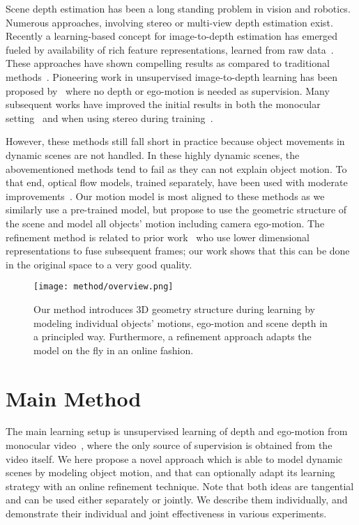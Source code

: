 \documentclass[letterpaper]{article} \usepackage{aaai19}  \usepackage{times}  \usepackage{helvet}  \usepackage{courier}  \usepackage{url}  \usepackage{graphicx}  \frenchspacing
\begin{document}
Scene depth estimation has been a long standing problem in vision and robotics. Numerous approaches, involving stereo or multi-view depth estimation exist.
Recently a learning-based concept for image-to-depth estimation has emerged fueled by availability of rich feature representations, learned from raw data~\cite{eigen2014depth,laina2016deeper}.
These approaches have shown compelling results as compared to traditional methods~\cite{karsch2014depth}.
Pioneering work in unsupervised image-to-depth learning has been proposed by~\cite{zhou2017unsupervised,garg2016unsupervised} where no depth or ego-motion is needed as supervision. Many subsequent works have improved the initial results in both the monocular setting~\cite{Yang2017unsupervised,yin2018geonet} and when using stereo during training~\cite{godard2017monodepth,ummenhofer2017demon,zhan2018unsupervised,yang2018every}.

However, these methods still fall short in practice because object movements in dynamic scenes are not handled. In these highly dynamic scenes, the abovementioned methods tend to fail as they can not explain object motion. To that end, optical flow models, trained separately, have been used with moderate improvements~\cite{yin2018geonet,yang2018lego,yang2018every}. Our motion model is most aligned to these methods as we similarly use a pre-trained model, but propose to use the geometric structure of the scene and model all objects' motion including camera ego-motion. The refinement method is related to prior work~\cite{bloesch2018codeslam} who use lower dimensional representations to fuse subsequent frames; our work shows that this can be done in the original space to a very good quality.

\begin{figure*}[t]
    \centering        
    \texttt{[image: method/overview.png]}
    \caption{Our method introduces 3D geometry structure during learning by modeling individual objects' motions, ego-motion and scene depth in a principled way. Furthermore, a refinement approach adapts the model on the fly in an online fashion.}
    \label{fig:approach}
\end{figure*}

\section{Main Method}

The main learning setup is unsupervised learning of depth and ego-motion from monocular video~\cite{zhou2017unsupervised}, where the only source of supervision is obtained from the video itself.
We here propose a novel approach which is able to model dynamic scenes by modeling object motion, and that can optionally adapt its learning strategy with an online refinement technique. Note that both ideas are tangential and can be used either separately or jointly. We describe them individually, and demonstrate their individual and joint effectiveness in various experiments.
\end{document}
